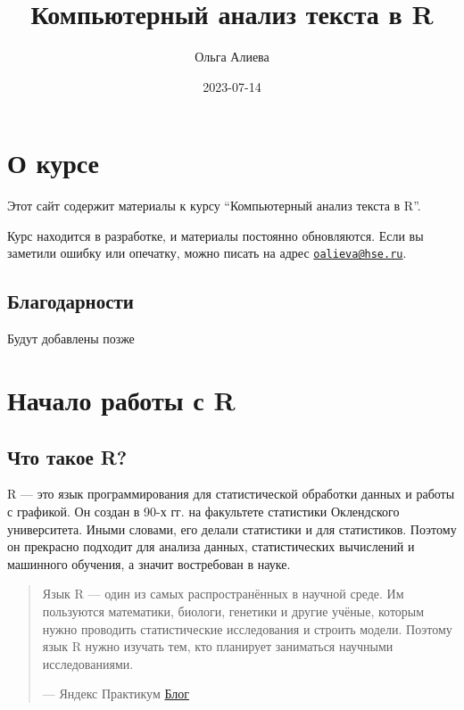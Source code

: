 \documentclass[
]{book}
\title{Компьютерный анализ текста в R}
\author{Ольга Алиева}
\date{2023-07-14}
\theoremstyle{definition}
\theoremstyle{definition}
\theoremstyle{definition}
\theoremstyle{definition}
\theoremstyle{remark}
\begin{document}
\maketitle

{
\setcounter{tocdepth}{1}
\tableofcontents
}
\hypertarget{ux43e-ux43aux443ux440ux441ux435}{%
\chapter{О курсе}\label{ux43e-ux43aux443ux440ux441ux435}}

Этот сайт содержит материалы к курсу ``Компьютерный анализ текста в R''.

Курс находится в разработке, и материалы постоянно обновляются. Если вы заметили ошибку или опечатку, можно писать на адрес \href{mailto:oalieva@hse.ru}{\nolinkurl{oalieva@hse.ru}}.

\hypertarget{ux431ux43bux430ux433ux43eux434ux430ux440ux43dux43eux441ux442ux438}{%
\section{Благодарности}\label{ux431ux43bux430ux433ux43eux434ux430ux440ux43dux43eux441ux442ux438}}

Будут добавлены позже

\hypertarget{ux43dux430ux447ux430ux43bux43e-ux440ux430ux431ux43eux442ux44b-ux441-r}{%
\chapter{Начало работы с R}\label{ux43dux430ux447ux430ux43bux43e-ux440ux430ux431ux43eux442ux44b-ux441-r}}

\hypertarget{ux447ux442ux43e-ux442ux430ux43aux43eux435-r}{%
\section{Что такое R?}\label{ux447ux442ux43e-ux442ux430ux43aux43eux435-r}}

R --- это язык программирования для статистической обработки данных и работы с графикой. Он создан в 90-х гг. на факультете статистики Оклендского университета. Иными словами, его делали статистики и для статистиков. Поэтому он прекрасно подходит для анализа данных, статистических вычислений и машинного обучения, а значит востребован в науке.

\begin{quote}
Язык R --- один из самых распространённых в научной среде. Им пользуются математики, биологи, генетики и другие учёные, которым нужно проводить статистические исследования и строить модели. Поэтому язык R нужно изучать тем, кто планирует заниматься научными исследованиями.

--- Яндекс Практикум \href{https://practicum.yandex.ru/blog/chto-takoe-yazyk-r/\#chto-takoe}{Блог}
\end{quote}
\end{document}
